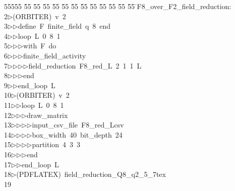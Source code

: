 %
%
\begin{tabbing}
55555 \= 55 \= 55 \= 55 \= 55 \= 55 \= 55 \= 55 \= 55 \= 55 \= 55 \= 55 \= 55 \= \>F8\_over\_F2\_field\_reduction:\\[0pt]
2\>$\triangleright$\>(ORBITER)\ v\ 2\ \\[0pt]
3\>$\triangleright$\>$\triangleright$\>define\ F\ finite\_field\ q\ 8\ end\ \\[0pt]
4\>$\triangleright$\>$\triangleright$\>loop\ L\ 0\ 8\ 1\ \\[0pt]
5\>$\triangleright$\>$\triangleright$\>$\triangleright$\>with\ F\ do\ \\[0pt]
6\>$\triangleright$\>$\triangleright$\>$\triangleright$\>finite\_field\_activity\ \\[0pt]
7\>$\triangleright$\>$\triangleright$\>$\triangleright$\>$\triangleright$\>field\_reduction\ F8\_red\_L\ 2\ 1\ 1\ L\ \\[0pt]
8\>$\triangleright$\>$\triangleright$\>$\triangleright$\>end\ \\[0pt]
9\>$\triangleright$\>$\triangleright$\>end\_loop\ L\\[0pt]
10\>$\triangleright$\>(ORBITER)\ v\ 2\ \\[0pt]
11\>$\triangleright$\>$\triangleright$\>loop\ L\ 0\ 8\ 1\ \\[0pt]
12\>$\triangleright$\>$\triangleright$\>$\triangleright$\>draw\_matrix\ \\[0pt]
13\>$\triangleright$\>$\triangleright$\>$\triangleright$\>$\triangleright$\>input\_csv\_file\ F8\_red\_Lcsv\ \\[0pt]
14\>$\triangleright$\>$\triangleright$\>$\triangleright$\>$\triangleright$\>box\_width\ 40\ bit\_depth\ 24\ \\[0pt]
15\>$\triangleright$\>$\triangleright$\>$\triangleright$\>$\triangleright$\>partition\ 4\ 3\ 3\ \\[0pt]
16\>$\triangleright$\>$\triangleright$\>$\triangleright$\>end\ \\[0pt]
17\>$\triangleright$\>$\triangleright$\>end\_loop\ L\\[0pt]
18\>$\triangleright$\>(PDFLATEX)\ field\_reduction\_Q8\_q2\_5\_7tex\\[0pt]
19\>\end{tabbing}
